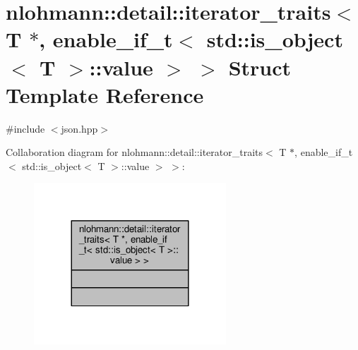 \hypertarget{structnlohmann_1_1detail_1_1iterator__traits_3_01T_01_5_00_01enable__if__t_3_01std_1_1is__object_3_01T_01_4_1_1value_01_4_01_4}{}\section{nlohmann\+:\+:detail\+:\+:iterator\+\_\+traits$<$ T $\ast$, enable\+\_\+if\+\_\+t$<$ std\+:\+:is\+\_\+object$<$ T $>$\+:\+:value $>$ $>$ Struct Template Reference}
\label{structnlohmann_1_1detail_1_1iterator__traits_3_01T_01_5_00_01enable__if__t_3_01std_1_1is__object_3_01T_01_4_1_1value_01_4_01_4}


{\ttfamily \#include $<$json.\+hpp$>$}



Collaboration diagram for nlohmann\+:\+:detail\+:\+:iterator\+\_\+traits$<$ T $\ast$, enable\+\_\+if\+\_\+t$<$ std\+:\+:is\+\_\+object$<$ T $>$\+:\+:value $>$ $>$\+:
\nopagebreak
\begin{figure}[H]
\begin{center}
\leavevmode
\includegraphics[width=204pt]{structnlohmann_1_1detail_1_1iterator__traits_3_01T_01_5_00_01enable__if__t_3_01std_1_1is__object9d6a70fc02590333f1f03725169acdf6}
\end{center}
\end{figure}
